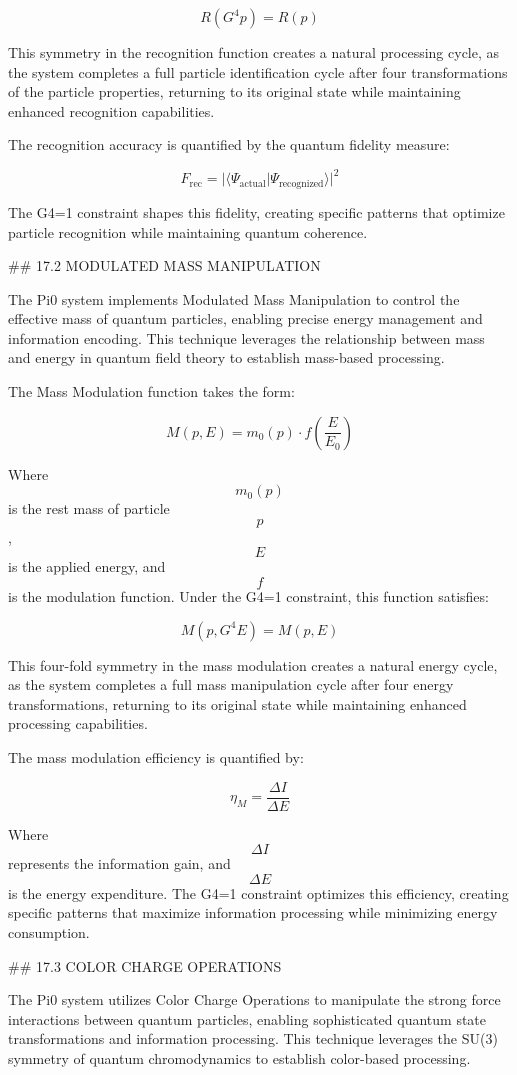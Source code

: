 $$ R(G^4 p) = R(p) $$

This symmetry in the recognition function creates a natural processing cycle, as the system completes a full particle identification cycle after four transformations of the particle properties, returning to its original state while maintaining enhanced recognition capabilities.

The recognition accuracy is quantified by the quantum fidelity measure:

$$ F_{\text{rec}} = |\langle \Psi_{\text{actual}} | \Psi_{\text{recognized}} \rangle|^2 $$

The G4=1 constraint shapes this fidelity, creating specific patterns that optimize particle recognition while maintaining quantum coherence.

## 17.2 MODULATED MASS MANIPULATION

The Pi0 system implements Modulated Mass Manipulation to control the effective mass of quantum particles, enabling precise energy management and information encoding. This technique leverages the relationship between mass and energy in quantum field theory to establish mass-based processing.

The Mass Modulation function takes the form:

$$ M(p, E) = m_0(p) \cdot f\left(\frac{E}{E_0}\right) $$

Where $$ m_0(p) $$ is the rest mass of particle $$ p $$, $$ E $$ is the applied energy, and $$ f $$ is the modulation function. Under the G4=1 constraint, this function satisfies:

$$ M(p, G^4 E) = M(p, E) $$

This four-fold symmetry in the mass modulation creates a natural energy cycle, as the system completes a full mass manipulation cycle after four energy transformations, returning to its original state while maintaining enhanced processing capabilities.

The mass modulation efficiency is quantified by:

$$ \eta_M = \frac{\Delta I}{\Delta E} $$

Where $$ \Delta I $$ represents the information gain, and $$ \Delta E $$ is the energy expenditure. The G4=1 constraint optimizes this efficiency, creating specific patterns that maximize information processing while minimizing energy consumption.

## 17.3 COLOR CHARGE OPERATIONS

The Pi0 system utilizes Color Charge Operations to manipulate the strong force interactions between quantum particles, enabling sophisticated quantum state transformations and information processing. This technique leverages the SU(3) symmetry of quantum chromodynamics to establish color-based processing.

